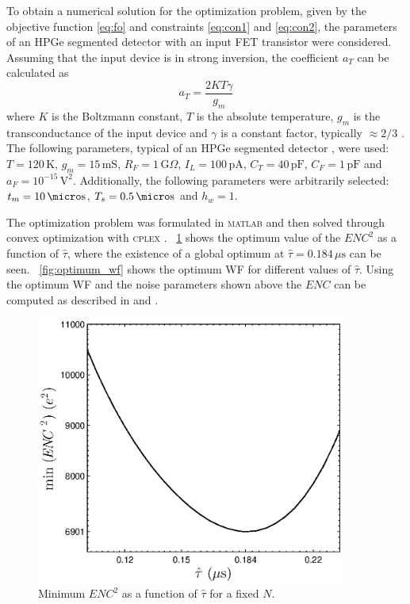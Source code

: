 To obtain a numerical solution for the optimization problem, given by the objective function \eqref{eq:fo} and constraints \eqref{eq:con1} and \eqref{eq:con2}, the parameters of an HPGe segmented detector with an input FET transistor were considered. Assuming that the input device is in strong inversion, the coefficient $a_T$ can be calculated as
	\begin{equation} 
		a_T = \frac{2 K T \gamma}{g_m}
	\end{equation}
where $K$ is the Boltzmann constant, $T$ is the absolute temperature, $g_m$ is the transconductance of the input device and $\gamma$ is a constant factor, typically $\approx 2/3$ \citep{van101}. The following parameters, typical of an HPGe segmented detector \citep{pullia102}, were used: $T = 120\,\text{K}$, $g_m = 15\,\text{mS}$, $R_F = 1\, \text{G}\Omega$, $I_L = 100\,\text{pA}$, $C_T = 40\,\text{pF}$, $C_F = 1\,\text{pF}$ and $a_F = 10^{-15}\,\text{V}^2$. Additionally, the following parameters were arbitrarily selected: $t_m = 10\,\micro \text{s}$, $T_s = 0.5\,\micro\text{s}$ and $h_w = 1$.

The optimization problem was formulated in \textsc{matlab} and then solved through convex optimization with \textsc{cplex} \citep{cplex}. \figurename~\ref{fig:optimum_tau} shows the optimum value of the $\mathit{ENC}^2$ as a function of $\hat{\tau}$, where the existence of a global optimum at $\hat{\tau} =0.184\,\mu\text{s}$ can be seen. \figurename~\ref{fig:optimum_wf} shows the optimum WF for different values of $\hat{\tau}$. Using the optimum WF and the noise parameters shown above the $\mathit{ENC}$ can be computed as described in \citep{gatti101} and \citep{pullia104}.

\begin{figure}[!t]
	\centering
	\includegraphics[width=4in]{./Figures/optimum_tau.eps}
	\caption{Minimum $\mathit{ENC}^2$ as a function of $\hat{\tau}$ for a fixed $N$.}\label{fig:optimum_tau}
\end{figure}

